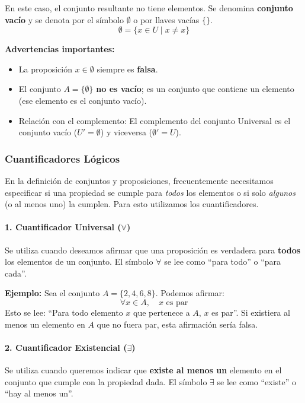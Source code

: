 En este caso, el conjunto resultante no tiene elementos. Se denomina \textbf{conjunto vacío} y se denota por el símbolo $\emptyset$ o por llaves vacías $\{ \}$.
\[ \emptyset = \{ x \in U \mid x \neq x \} \]

\noindent \textbf{Advertencias importantes:}
\begin{itemize}
    \item La proposición $x \in \emptyset$ siempre es \textbf{falsa}.
    \item El conjunto $A=\{\emptyset\}$ \textbf{no es vacío}; es un conjunto que contiene un elemento (ese elemento es el conjunto vacío).
    \item Relación con el complemento: El complemento del conjunto Universal es el conjunto vacío ($U' = \emptyset$) y viceversa ($\emptyset' = U$).
\end{itemize}

\subsubsection{Cuantificadores Lógicos}

En la definición de conjuntos y proposiciones, frecuentemente necesitamos especificar si una propiedad se cumple para \textit{todos} los elementos o si solo \textit{algunos} (o al menos uno) la cumplen. Para esto utilizamos los cuantificadores.

\paragraph{1. Cuantificador Universal ($\forall$)}
Se utiliza cuando deseamos afirmar que una proposición es verdadera para \textbf{todos} los elementos de un conjunto. El símbolo $\forall$ se lee como ``para todo'' o ``para cada''.

\noindent \textbf{Ejemplo:}
Sea el conjunto $A=\{ 2,4,6,8\}$. Podemos afirmar:
\[ \forall x \in A, \quad x \text{ es par} \]
Esto se lee: ``Para todo elemento $x$ que pertenece a $A$, $x$ es par''. Si existiera al menos un elemento en $A$ que no fuera par, esta afirmación sería falsa.

\paragraph{2. Cuantificador Existencial ($\exists$)}
Se utiliza cuando queremos indicar que \textbf{existe al menos un} elemento en el conjunto que cumple con la propiedad dada. El símbolo $\exists$ se lee como ``existe'' o ``hay al menos un''.

